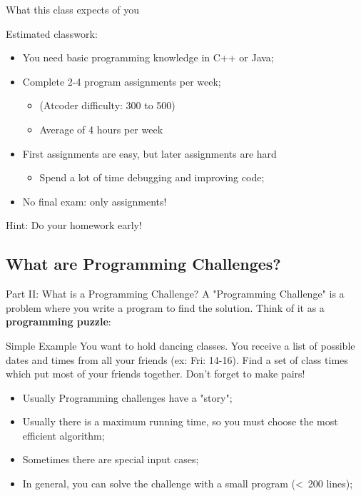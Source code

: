 \begin{frame}{What this class expects of you}
  \begin{exampleblock}{Estimated classwork:}
    \begin{itemize}
      \item You need basic programming knowledge in C++ or Java;
      \medskip

      \item Complete 2-4 program assignments per week;
      \begin{itemize}
        \item (Atcoder difficulty: 300 to 500)
        \item Average of 4 hours per week
      \end{itemize}
      \medskip

      \item First assignments are easy, but later assignments are hard
      \begin{itemize}
        \item Spend a lot of time debugging and improving code;
      \end{itemize}
      \medskip

      \item No final exam: only assignments!
    \end{itemize}
  \end{exampleblock}
  \hfill Hint: Do your homework early!
\end{frame}

\subsection{What are Programming Challenges?}
\begin{frame}{Part II: What is a Programming Challenge?}
  A "Programming Challenge" is a problem where you write a program to find the solution. Think of it as a {\bf programming puzzle}:

  \begin{block}{Simple Example}
    You want to hold dancing classes. You receive a list of possible dates and
    times from all your friends (ex: Fri: 14-16). Find a set of class times
    which put most of your friends together. Don't forget to make pairs!
  \end{block}
  \bigskip

  \begin{itemize}
    \item Usually Programming challenges have a "story";
    \item Usually there is a maximum running time, so you must choose the
      most efficient algorithm;
    \item Sometimes there are special input cases;
    \item In general, you can solve the challenge with a small program (<~200 lines);
  \end{itemize}
\end{frame}


